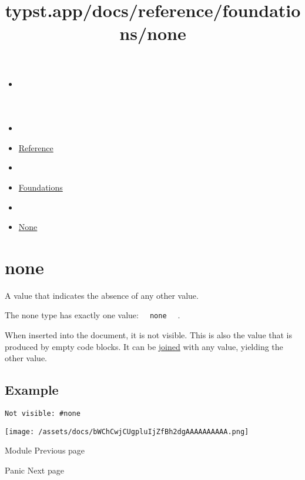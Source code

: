 \title{typst.app/docs/reference/foundations/none}

\begin{itemize}
\tightlist
\item
  \href{/docs}{}
\item
  
\item
  \href{/docs/reference/}{Reference}
\item
  
\item
  \href{/docs/reference/foundations/}{Foundations}
\item
  
\item
  \href{/docs/reference/foundations/none/}{None}
\end{itemize}

\section{\texorpdfstring{{ none }}{ none }}\label{summary}

A value that indicates the absence of any other value.

The none type has exactly one value:
\texttt{\ }{\texttt{\ none\ }}\texttt{\ } .

When inserted into the document, it is not visible. This is also the
value that is produced by empty code blocks. It can be
\href{/docs/reference/scripting/\#blocks}{joined} with any value,
yielding the other value.

\subsection{Example}\label{example}

\begin{verbatim}
Not visible: #none
\end{verbatim}

\texttt{[image: /assets/docs/bWChCwjCUgpluIjZfBh2dgAAAAAAAAAA.png]}

\href{/docs/reference/foundations/module/}{\pandocbounded{}}

{ Module } { Previous page }

\href{/docs/reference/foundations/panic/}{\pandocbounded{}}

{ Panic } { Next page }
